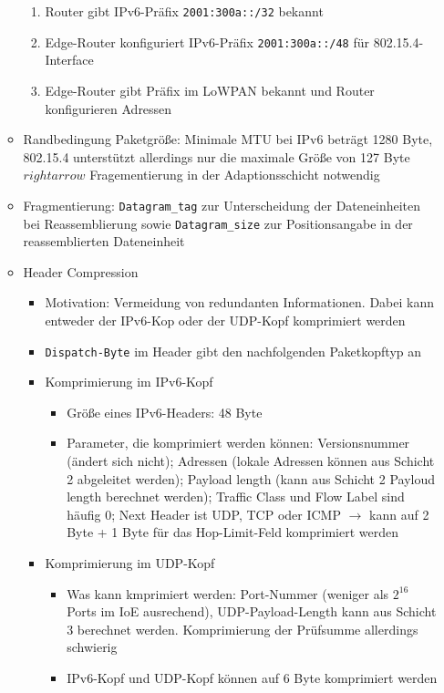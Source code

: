 \begin{itemize}
\begin{itemize}
		\begin{enumerate}
			\item Router gibt IPv6-Präfix \texttt{2001:300a::/32} bekannt
			\item Edge-Router konfiguriert IPv6-Präfix \texttt{2001:300a::/48} für 802.15.4-Interface
			\item Edge-Router gibt Präfix im LoWPAN bekannt und Router konfigurieren Adressen
		\end{enumerate}
		\item Randbedingung Paketgröße: Minimale MTU bei IPv6 beträgt 1280 Byte, 802.15.4 unterstützt allerdings nur die maximale Größe von 127 Byte \(rightarrow\) Fragementierung in der Adaptionsschicht notwendig
		\item Fragmentierung: \texttt{Datagram\_tag} zur Unterscheidung der Dateneinheiten bei Reassemblierung sowie \texttt{Datagram\_size} zur Positionsangabe in der reassemblierten Dateneinheit
		\item Header Compression
		\begin{itemize}
			\item Motivation: Vermeidung von redundanten Informationen. Dabei kann entweder der IPv6-Kop oder der UDP-Kopf komprimiert werden
			\item \texttt{Dispatch-Byte} im Header gibt den nachfolgenden Paketkopftyp an
			\item Komprimierung im IPv6-Kopf
			\begin{itemize}
				\item Größe eines IPv6-Headers: 48 Byte
				\item Parameter, die komprimiert werden können: Versionsnummer (ändert sich nicht); Adressen (lokale Adressen können aus Schicht 2 abgeleitet werden); Payload length (kann aus Schicht 2 Payloud length berechnet werden); Traffic Class und Flow Label sind häufig \(0\); Next Header ist UDP, TCP oder ICMP \(\rightarrow\) kann auf 2 Byte + 1 Byte für das Hop-Limit-Feld komprimiert werden
			\end{itemize}
			\item Komprimierung im UDP-Kopf
			\begin{itemize}
				\item Was kann kmprimiert werden: Port-Nummer (weniger als \(2^{16}\) Ports im IoE ausrechend), UDP-Payload-Length kann aus Schicht 3 berechnet werden. Komprimierung der Prüfsumme allerdings schwierig
				\item IPv6-Kopf und UDP-Kopf können auf 6 Byte komprimiert werden
			\end{itemize}

\end{itemize}
\end{itemize}
\end{itemize}
